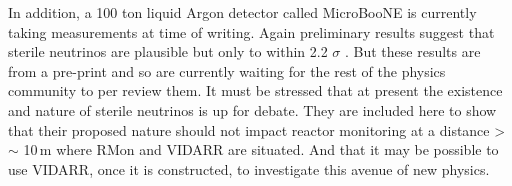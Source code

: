 In addition, a 100 ton liquid Argon detector called MicroBooNE \cite{Karagiorgi_2012} is currently taking measurements at time of writing. Again preliminary results suggest that sterile neutrinos are plausible but only to within 2.2 $\sigma$ \cite{denton2021sterile}. But these results are from a pre-print and so are currently waiting for the rest of the physics community to per review them. It must be stressed that at present the existence and nature of sterile neutrinos is up for debate. They are included here to show that their proposed nature should not impact reactor monitoring at a distance > $\sim$ 10\,m  where RMon and VIDARR are situated. And that it may be possible to use VIDARR, once it is constructed, to investigate this avenue of new physics.

